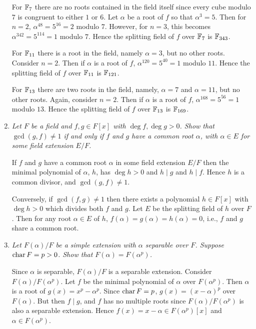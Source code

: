 \documentclass[10pt]{article}
\begin{document}
\begin{enumerate}
For $\mathbb{F}_7$ there are no roots contained in the field itself since every cube modulo $7$ is congruent to either $1$ or $6$.  Let $\alpha$ be a root of $f$ so that $\alpha^3 = 5$.  Then for $n=2$, $\alpha^{48} = 5^{16} = 2$ modulo $7$.  However, for $n=3$, this becomes $\alpha^{342} = 5^{114} = 1$ modulo $7$.  Hence the splitting field of $f$ over $\mathbb{F}_7$ is $\mathbb{F}_{343}$.

For $\mathbb{F}_{11}$ there is a root in the field, namely $\alpha = 3$, but no other roots.  Consider $n=2$.  Then if $\alpha$ is a root of $f$, $\alpha^{120} = 5^{40} = 1$ modulo $11$.  Hence the splitting field of $f$ over $\mathbb{F}_{11}$ is $\mathbb{F}_{121}$.

For $\mathbb{F}_{13}$ there are two roots in the field, namely, $\alpha=7$ and $\alpha=11$, but no other roots.  Again, consider $n=2$.  Then if $\alpha$ is a root of $f$, $\alpha^{168} = 5^{56} = 1$ modulo $13$.  Hence the splitting field of $f$ over $\mathbb{F}_{13}$ is $\mathbb{F}_{169}$.

\item \emph{Let $F$ be a field and $f,g \in F[x]$ with $\deg f, \deg g > 0$.  Show that $\gcd(g,f) \neq 1$ if and only if $f$ and $g$ have a common root $\alpha$, with $\alpha \in E$ for some field extension $E/F$.}

If $f$ and $g$ have a common root $\alpha$ in some field extension $E/F$ then the minimal polynomial of $\alpha$, $h$, has $\deg h > 0$ and $h \mid g$ and $h \mid f$.  Hence $h$ is a common divisor, and $\gcd(g,f) \neq 1$.

Conversely, if $\gcd(f,g) \neq 1$ then there exists a polynomial $h \in F[x]$ with $\deg h > 0$ which divides both $f$ and $g$.  Let $E$ be the splitting field of $h$ over $F$.  Then for any root $\alpha \in E$ of $h$, $f(\alpha) = g(\alpha) = h(\alpha) = 0$, i.e., $f$ and $g$ share a common root.

\item \emph{Let $F(\alpha)/F$ be a simple extension with $\alpha$ separable over $F$.  Suppose $\operatorname{char} F = p > 0$.  Show that $F(\alpha) = F(\alpha^p)$.}

Since $\alpha$ is separable, $F(\alpha)/F$ is a separable extension.  Consider $F(\alpha)/F(\alpha^p)$.  Let $f$ be the minimal polynomial of $\alpha$ over $F(\alpha^p)$.  Then $\alpha$ is a root of $g(x) = x^p-\alpha^p$.  Since $\operatorname{char} F = p$, $g(x) = (x - \alpha)^p$ over $F(\alpha)$.  But then $f \mid g$, and $f$ has no multiple roots since $F(\alpha)/F(\alpha^p)$ is also a separable extension.  Hence $f(x) = x - \alpha \in F(\alpha^p)[x]$ and $\alpha \in F(\alpha^p)$.


\end{enumerate}
\end{document}
